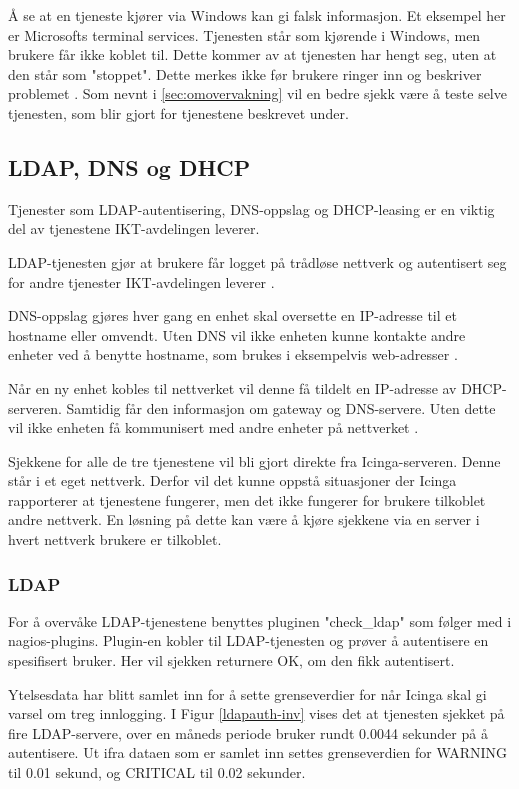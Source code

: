 Å se at en tjeneste kjører via Windows kan gi falsk informasjon. Et eksempel her er Microsofts terminal services. Tjenesten står som kjørende i Windows, men brukere får ikke koblet til. Dette kommer av at tjenesten har hengt seg, uten at den står som "stoppet". Dette merkes ikke før brukere ringer inn og beskriver problemet \cite{serviceproblem}. Som nevnt i \ref{sec:omovervakning} vil en bedre sjekk være å teste selve tjenesten, som blir gjort for tjenestene beskrevet under.

\subsection{LDAP, DNS og DHCP}
Tjenester som LDAP-autentisering, DNS-oppslag og DHCP-leasing er en viktig del av tjenestene IKT-avdelingen leverer.

LDAP-tjenesten gjør at brukere får logget på trådløse nettverk og autentisert seg for andre tjenester IKT-avdelingen leverer \cite{ldap}.

DNS-oppslag gjøres hver gang en enhet skal oversette en IP-adresse til et hostname eller omvendt. Uten DNS vil ikke enheten kunne kontakte andre enheter ved å benytte hostname, som brukes i eksempelvis web-adresser \cite{dns}. 

Når en ny enhet kobles til nettverket vil denne få tildelt en IP-adresse av DHCP-serveren. Samtidig får den informasjon om gateway og DNS-servere. Uten dette vil ikke enheten få kommunisert med andre enheter på nettverket \cite{dhcp}.

Sjekkene for alle de tre tjenestene vil bli gjort direkte fra Icinga-serveren. Denne står i et eget nettverk. Derfor vil det kunne oppstå situasjoner der Icinga rapporterer at tjenestene fungerer, men det ikke fungerer for brukere tilkoblet andre nettverk. En løsning på dette kan være å kjøre sjekkene via en server i hvert nettverk brukere er tilkoblet.

\subsubsection*{LDAP}
For å overvåke LDAP-tjenestene benyttes pluginen "check\_ldap" som følger med i nagios-plugins. Plugin-en kobler til LDAP-tjenesten og prøver å autentisere en spesifisert bruker. Her vil sjekken returnere OK, om den fikk autentisert. 

Ytelsesdata har blitt samlet inn for å sette grenseverdier for når Icinga skal gi varsel om treg innlogging. I Figur \ref{ldapauth-inv} vises det at tjenesten sjekket på fire LDAP-servere, over en måneds periode bruker rundt 0.0044 sekunder på å autentisere. Ut ifra dataen som er samlet inn settes grenseverdien for WARNING til 0.01 sekund, og CRITICAL til 0.02 sekunder.

